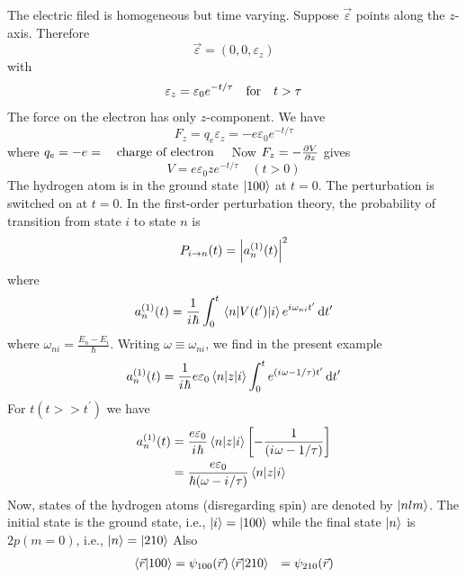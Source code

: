 The electric filed is homogeneous but time varying. Suppose $\vec{\varepsilon}$ points along the $z$-axis. Therefore
\begin{equation}
\vec{\varepsilon} = (0, 0, \varepsilon_z)
\end{equation}
with
\begin{equation}
\varepsilon_z = \varepsilon_0 e^{-t / \tau} \qq{for} t>\tau
\end{equation}
The force on the electron has only $z$-component. We have
\begin{equation}
F_z = q_e \varepsilon_z = - e \varepsilon_0 e^{-t/\tau}
\end{equation}
where $q_e = -e = \qq{charge of electron}$
Now $F_z = - \pdv{V}{z}$ gives
\begin{equation}
\label{chapter23.eqn1-oscillating}
V = e \varepsilon_0 z e^{-t/\tau} \quad (t > 0)
\end{equation}
The hydrogen atom is in the ground state $\ket{100}$ at $t=0$. The perturbation is switched on at $t=0$. In the first-order perturbation theory, the probability of transition from state $i$ to state $n$ is 
\begin{equation}
P_{i \rightarrow n}(t) = \abs{a_n^{(1)}(t)}^2
\end{equation}
where
\begin{equation}
a_n^{(1)}(t) = \frac{1}{{i\mkern1mu} \hbar} \int_{0}^{t} \mel{n}{V(t^\prime)}{i} e^{{i\mkern1mu} \omega_{n i} t^\prime} \dd{t^\prime}
\end{equation}
where $\omega_{n i} = \frac{E_n - E_i}{\hbar}$. Writing $\omega \equiv \omega_{n i}$, we find in the present example
\begin{equation}
a_n^{(1)}(t) = \frac{1}{{i\mkern1mu} \hbar} e \varepsilon_0 \mel{n}{z}{i} \int_{0}^{t} e^{({i\mkern1mu} \omega - 1/\tau) t^\prime} \dd{t^\prime}
\end{equation}
For $t (t >> t^\prime)$ we have
\begin{align}
a_n^{(1)}(t) 
&= \frac{e \varepsilon_0}{{i\mkern1mu} \hbar}  \mel{n}{z}{i} \left[- \frac{1}{({i\mkern1mu} \omega - 1/\tau)}\right] \nonumber\\
&= \frac{e \varepsilon_0}{\hbar(\omega - {i\mkern1mu}/\tau)}  \mel{n}{z}{i}
\label{chapter23.eqn2-oscillating}
\end{align}
Now, states of the hydrogen atoms (disregarding spin) are denoted by $\ket{n l m}$. The initial state is the ground state, i.e., $\ket{i} = \ket{1 0 0}$ while the final state $\ket{n}$ is $2 p (m=0)$, i.e., $\ket{n} = \ket{2 1 0}$
Also
\begin{align*}
\braket{\vec{r}}{1 0 0} &= \psi_{1 0 0}(\vec{r})
\braket{\vec{r}}{2 1 0} &= \psi_{2 1 0}(\vec{r})
\end{align*}
